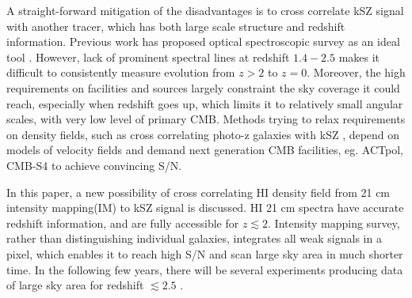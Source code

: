 A straight-forward mitigation of the disadvantages is to cross correlate 
kSZ signal with another tracer, which has both large scale structure and redshift information. 
Previous work has proposed optical spectroscopic survey as an ideal tool \cite{Hand12,Shao11,Li14}. 
However, lack of prominent spectral lines at redshift $1.4-2.5$ 
makes it difficult to consistently measure evolution from $z>2$ to $z=0$. 
Moreover, the high requirements on facilities and sources 
largely constraint the sky coverage it could reach, 
especially when redshift goes up, 
which limits it to relatively small angular scales, 
with very low level of primary CMB. 
%
Methods trying to relax requirements on density fields, such as 
cross correlating photo-z galaxies with kSZ \cite{Hill16,Ferraro16}, 
depend on models of velocity fields and   
demand next generation CMB facilities, eg. 
ACTpol, CMB-S4 
to achieve 
convincing S/N.


In this paper, a new possibility of cross correlating HI density field from 21 cm intensity mapping(IM) to kSZ signal is discussed. 
HI 21 cm spectra have accurate redshift information, 
and are fully accessible for $z\lesssim2$.  
Intensity mapping survey, 
rather than distinguishing individual galaxies, 
integrates all weak signals in a pixel,  
which enables it to reach high S/N and scan large sky area 
in much shorter time. 
In the following few years, there will be several experiments 
producing data of large sky area for redshift $\lesssim2.5$ 
\cite{2014CHIME, TIANLAI, HIRAX}.

